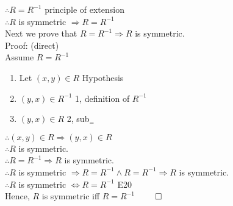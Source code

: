 \documentclass{article}
\begin{document}
			$\therefore R = R^{-1}$ \hfill principle of extension \\
			$\therefore R$ is symmetric $\Rightarrow R = R^{-1}$ \\
			Next we prove that $R = R^{-1} \Rightarrow R$ is symmetric. \\
			Proof: (direct) \\
			Assume $R = R^{-1}$
			\begin{enumerate}
				\item Let $(x, y) \in R$ \hfill Hypothesis
				\item $(y, x) \in R^{-1}$ \hfill 1, definition of $R^{-1}$
				\item $(y, x) \in R$ \hfill 2, sub$_{=}$
			\end{enumerate}
			$\therefore (x, y) \in R \Rightarrow (y, x) \in R$ \\
			$\therefore R$ is symmetric. \\
			$\therefore R = R^{-1} \Rightarrow R$ is symmetric. \\
			$\therefore R$ is symmetric $\Rightarrow R = R^{-1} \land R = R^{-1} \Rightarrow R$ is symmetric. \\
			$\therefore R$ is symmetric $\Leftrightarrow R = R^{-1}$ \hfill E20 \\
			Hence, $R$ is symmetric iff $R = R^{-1}$ \hfill $\qed$
\end{document}
